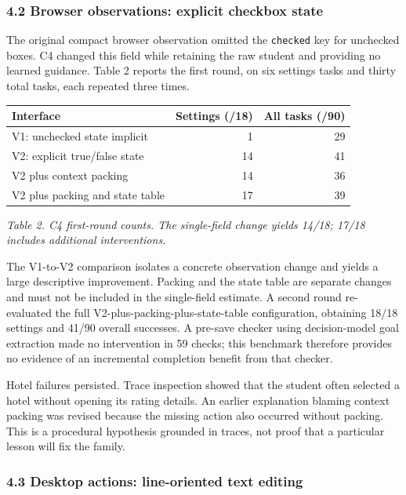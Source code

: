 \documentclass[
  10pt,
]{article}
\newcounter{none} %
\begin{document}
\subsubsection{4.2 Browser observations: explicit checkbox
state}\label{browser-observations-explicit-checkbox-state}

The original compact browser observation omitted the \texttt{checked}
key for unchecked boxes. C4 changed this field while retaining the raw
student and providing no learned guidance. Table 2 reports the first
round, on six settings tasks and thirty total tasks, each repeated three
times.

{\def\LTcaptype{none} %
\begin{longtable}[]{@{}lrr@{}}
\toprule\noalign{}
Interface & Settings (/18) & All tasks (/90) \\
\midrule\noalign{}
\endhead
\bottomrule\noalign{}
\endlastfoot
V1: unchecked state implicit & 1 & 29 \\
V2: explicit true/false state & 14 & 41 \\
V2 plus context packing & 14 & 36 \\
V2 plus packing and state table & 17 & 39 \\
\end{longtable}
}

\emph{Table 2. C4 first-round counts. The single-field change yields
14/18; 17/18 includes additional interventions.}

The V1-to-V2 comparison isolates a concrete observation change and
yields a large descriptive improvement. Packing and the state table are
separate changes and must not be included in the single-field estimate.
A second round re-evaluated the full V2-plus-packing-plus-state-table
configuration, obtaining 18/18 settings and 41/90 overall successes. A
pre-save checker using decision-model goal extraction made no
intervention in 59 checks; this benchmark therefore provides no evidence
of an incremental completion benefit from that checker.

Hotel failures persisted. Trace inspection showed that the student often
selected a hotel without opening its rating details. An earlier
explanation blaming context packing was revised because the missing
action also occurred without packing. This is a procedural hypothesis
grounded in traces, not proof that a particular lesson will fix the
family.

\subsubsection{4.3 Desktop actions: line-oriented text
editing}\label{desktop-actions-line-oriented-text-editing}
\end{document}
